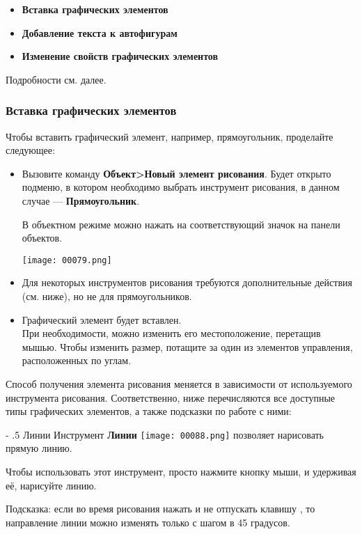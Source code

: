 ﻿\documentclass[a4paper,10pt]{article}
\makeatletter
\renewcommand\paragraph{%
   \@startsection{paragraph}{4}{0mm}%
      {-\baselineskip}%
      {.5\baselineskip}%
      {\normalfont\normalsize\bfseries}}
\makeatother
\begin{document}
\begin{itemize}
 \item \textbf{Вставка графических элементов}
 \item \textbf{Добавление текста к автофигурам}
 \item \textbf{Изменение свойств графических элементов}
\end{itemize}

Подробности см. далее.

\subsubsection{Вставка графических элементов}
Чтобы вставить графический элемент, например, прямоугольник, проделайте следующее: 
\begin{itemize}
 \item Вызовите команду \textbf{Объект>Новый элемент рисования}. Будет открыто подменю, в котором необходимо выбрать инструмент рисования, в данном случае — \textbf{Прямоугольник}.
 
 В объектном режиме можно нажать на соответствующий значок на панели объектов.
 
 \texttt{[image: 00079.png]}
 
 \item Для некоторых инструментов рисования требуются дополнительные действия (см. ниже), но не для прямоугольников.
 \item Графический элемент будет вставлен.\\
 При необходимости, можно изменить его местоположение, перетащив мышью. Чтобы изменить размер, потащите за один из элементов управления, расположенных по углам.
\end{itemize}

Способ получения элемента рисования меняется в зависимости от используемого инструмента рисования. Соответственно, ниже перечисляются все доступные типы графических элементов, а также подсказки по работе с ними:

\paragraph{Линии}
Инструмент \textbf{Линии} \texttt{[image: 00088.png]} позволяет нарисовать прямую линию.

Чтобы использовать этот инструмент, просто нажмите кнопку мыши, и удерживая её, нарисуйте линию.

Подсказка: если во время рисования нажать и не отпускать клавишу , то направление линии можно изменять только с шагом в 45 градусов.
\end{document}
